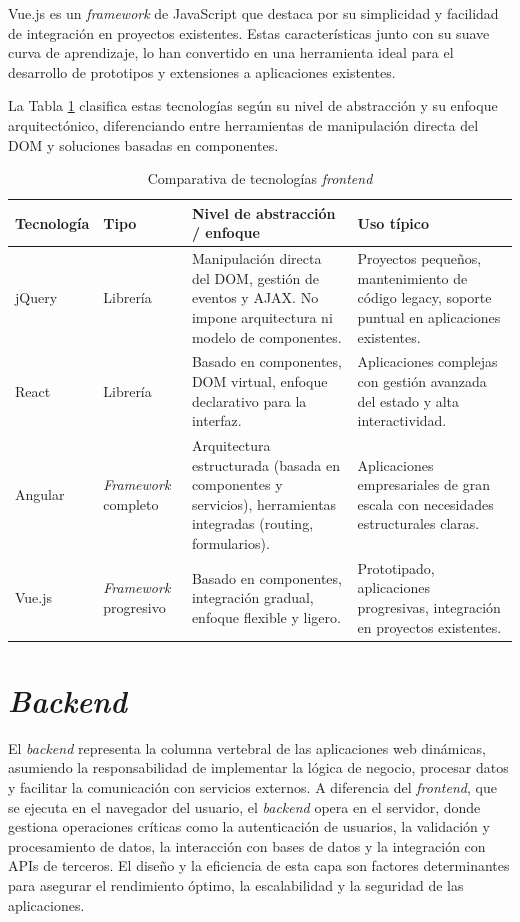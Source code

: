 Vue.js es un \textit{framework} de JavaScript que destaca por su simplicidad y facilidad de integración en proyectos existentes. Estas características junto con su suave curva de aprendizaje, lo han convertido en una herramienta ideal para el desarrollo de prototipos y extensiones a aplicaciones existentes. 

La Tabla \ref{tab:frontend_technologies} clasifica estas tecnologías según su nivel de abstracción y su enfoque arquitectónico, diferenciando entre herramientas de manipulación directa del DOM y soluciones basadas en componentes.

\begin{table}[h!]
\centering
\footnotesize
\begin{tabularx}{\textwidth}{>{\raggedright\arraybackslash}X >{\raggedright\arraybackslash}X >{\raggedright\arraybackslash}X p{4.5cm}}
\toprule
\textbf{Tecnología} & \textbf{Tipo} & \textbf{Nivel de abstracción / enfoque} & \textbf{Uso típico} \\
\midrule 
jQuery & Librería & Manipulación directa del DOM, gestión de eventos y AJAX. No impone arquitectura ni modelo de componentes. & Proyectos pequeños, mantenimiento de código legacy, soporte puntual en aplicaciones existentes. \\
\midrule
React & Librería & Basado en componentes, DOM virtual, enfoque declarativo para la interfaz. & Aplicaciones complejas con gestión avanzada del estado y alta interactividad. \\
\midrule
Angular & \textit{Framework} completo & Arquitectura estructurada (basada en componentes y servicios), herramientas integradas (routing, formularios). & Aplicaciones empresariales de gran escala con necesidades estructurales claras. \\
\midrule
Vue.js & \textit{Framework} progresivo & Basado en componentes, integración gradual, enfoque flexible y ligero. & Prototipado, aplicaciones progresivas, integración en proyectos existentes. \\
\bottomrule
\end{tabularx}
\caption{Comparativa de tecnologías \textit{frontend}}
\label{tab:frontend_technologies}
\end{table}


\section{\textit{Backend}}

El \textit{backend} representa la columna vertebral de las aplicaciones web dinámicas, asumiendo la responsabilidad de implementar la lógica de negocio, procesar datos y facilitar la comunicación con servicios externos. A diferencia del \textit{frontend}, que se ejecuta en el navegador del usuario, el \textit{backend} opera en el servidor, donde gestiona operaciones críticas como la autenticación de usuarios, la validación y procesamiento de datos, la interacción con bases de datos y la integración con APIs de terceros. El diseño y la eficiencia de esta capa son factores determinantes para asegurar el rendimiento óptimo, la escalabilidad y la seguridad de las aplicaciones.

